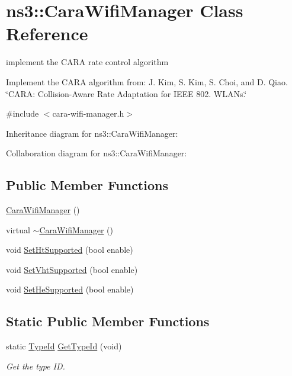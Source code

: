 \hypertarget{classns3_1_1CaraWifiManager}{}\section{ns3\+:\+:Cara\+Wifi\+Manager Class Reference}
\label{classns3_1_1CaraWifiManager}


implement the C\+A\+RA rate control algorithm

Implement the C\+A\+RA algorithm from\+: J. Kim, S. Kim, S. Choi, and D. Qiao. \char`\"{}\+C\+A\+R\+A\+: Collision-\/\+Aware Rate Adaptation for I\+E\+E\+E 802. W\+L\+A\+Ns.\char`\"{}  




{\ttfamily \#include $<$cara-\/wifi-\/manager.\+h$>$}



Inheritance diagram for ns3\+:\+:Cara\+Wifi\+Manager\+:


Collaboration diagram for ns3\+:\+:Cara\+Wifi\+Manager\+:
\subsection*{Public Member Functions}
\begin{DoxyCompactItemize}
\item 
\hyperlink{classns3_1_1CaraWifiManager_a3954b99f137c3755f5c284af101fb298}{Cara\+Wifi\+Manager} ()
\item 
virtual \hyperlink{classns3_1_1CaraWifiManager_a6ba20a404cf24d5bec4d80932aae5da0}{$\sim$\+Cara\+Wifi\+Manager} ()
\item 
void \hyperlink{classns3_1_1CaraWifiManager_a3c4d4f6f392267e414ccb72c03ddb849}{Set\+Ht\+Supported} (bool enable)
\item 
void \hyperlink{classns3_1_1CaraWifiManager_ab606b5d8def0197b37c200dee2801720}{Set\+Vht\+Supported} (bool enable)
\item 
void \hyperlink{classns3_1_1CaraWifiManager_a0ae278428a75ba0bedf68e0b68fe7ec1}{Set\+He\+Supported} (bool enable)
\end{DoxyCompactItemize}
\subsection*{Static Public Member Functions}
\begin{DoxyCompactItemize}
\item 
static \hyperlink{classns3_1_1TypeId}{Type\+Id} \hyperlink{classns3_1_1CaraWifiManager_a98145ff582608e7013c0d2da4a96e85b}{Get\+Type\+Id} (void)
\begin{DoxyCompactList}\small\item\em Get the type ID. \end{DoxyCompactList}\end{DoxyCompactItemize}
